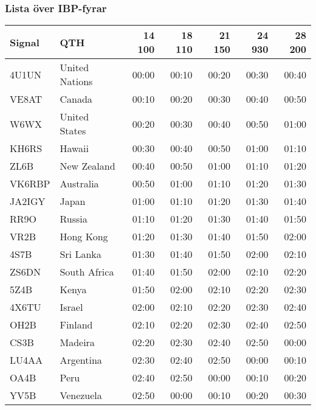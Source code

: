 \subsubsection{Lista över IBP-fyrar}
\begin{tabular}{llrrrrr}
\textbf{Signal} & \textbf{QTH} & \textbf{14 100} & \textbf{18 110} & \textbf{21 150} & \textbf{24 930} & \textbf{28 200} \\ \hline

4U1UN  & United Nations & 00:00  & 00:10  & 00:20  & 00:30  & 00:40  \\ 
VE8AT  & Canada         & 00:10  & 00:20  & 00:30  & 00:40  & 00:50  \\
W6WX   & United States  & 00:20  & 00:30  & 00:40  & 00:50  & 01:00  \\
KH6RS  & Hawaii         & 00:30  & 00:40  & 00:50  & 01:00  & 01:10  \\
ZL6B   & New Zealand    & 00:40  & 00:50  & 01:00  & 01:10  & 01:20  \\
VK6RBP & Australia      & 00:50  & 01:00  & 01:10  & 01:20  & 01:30  \\
JA2IGY & Japan          & 01:00  & 01:10  & 01:20  & 01:30  & 01:40  \\
RR9O   & Russia         & 01:10  & 01:20  & 01:30  & 01:40  & 01:50  \\
VR2B   & Hong Kong      & 01:20  & 01:30  & 01:40  & 01:50  & 02:00  \\
4S7B   & Sri Lanka      & 01:30  & 01:40  & 01:50  & 02:00  & 02:10  \\
ZS6DN  & South Africa   & 01:40  & 01:50  & 02:00  & 02:10  & 02:20  \\
5Z4B   & Kenya          & 01:50  & 02:00  & 02:10  & 02:20  & 02:30  \\
4X6TU  & Israel         & 02:00  & 02:10  & 02:20  & 02:30  & 02:40  \\
OH2B   & Finland        & 02:10  & 02:20  & 02:30  & 02:40  & 02:50  \\
CS3B   & Madeira        & 02:20  & 02:30  & 02:40  & 02:50  & 00:00  \\
LU4AA  & Argentina      & 02:30  & 02:40  & 02:50  & 00:00  & 00:10  \\
OA4B   & Peru           & 02:40  & 02:50  & 00:00  & 00:10  & 00:20  \\
YV5B   & Venezuela      & 02:50  & 00:00  & 00:10  & 00:20  & 00:30  \\
\end{tabular}




